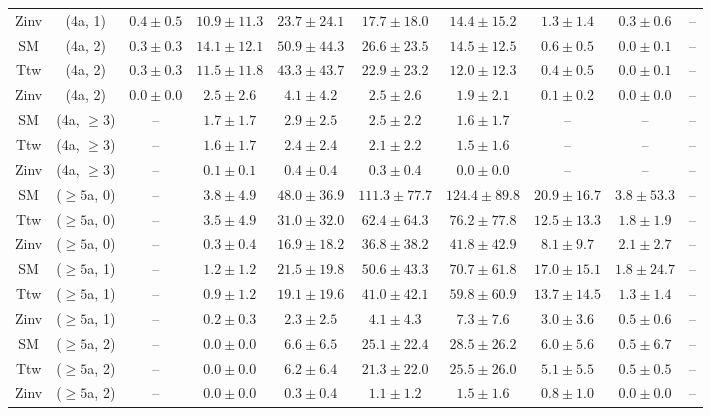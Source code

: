 \begin{table}[h!]
{\begin{tabular}{cccccccccc}
	Zinv & (4a, 1) & $0.4\pm 0.5$ & $10.9\pm 11.3$ & $23.7\pm 24.1$ & $17.7\pm 18.0$ & $14.4\pm 15.2$ & $1.3\pm 1.4$ & $0.3\pm 0.6$ & -- \\[0.5ex] 
	SM & (4a, 2) & $0.3\pm 0.3$ & $14.1\pm 12.1$ & $50.9\pm 44.3$ & $26.6\pm 23.5$ & $14.5\pm 12.5$ & $0.6\pm 0.5$ & $0.0\pm 0.1$ & -- \\[0.5ex] 
	Ttw & (4a, 2) & $0.3\pm 0.3$ & $11.5\pm 11.8$ & $43.3\pm 43.7$ & $22.9\pm 23.2$ & $12.0\pm 12.3$ & $0.4\pm 0.5$ & $0.0\pm 0.1$ & -- \\[0.5ex] 
	Zinv & (4a, 2) & $0.0\pm 0.0$ & $2.5\pm 2.6$ & $4.1\pm 4.2$ & $2.5\pm 2.6$ & $1.9\pm 2.1$ & $0.1\pm 0.2$ & $0.0\pm 0.0$ & -- \\[0.5ex] 
	SM & (4a, $\ge3$) & -- & $1.7\pm 1.7$ & $2.9\pm 2.5$ & $2.5\pm 2.2$ & $1.6\pm 1.7$ & -- & -- & -- \\[0.5ex] 
	Ttw & (4a, $\ge3$) & -- & $1.6\pm 1.7$ & $2.4\pm 2.4$ & $2.1\pm 2.2$ & $1.5\pm 1.6$ & -- & -- & -- \\[0.5ex] 
	Zinv & (4a, $\ge3$) & -- & $0.1\pm 0.1$ & $0.4\pm 0.4$ & $0.3\pm 0.4$ & $0.0\pm 0.0$ & -- & -- & -- \\[0.5ex] 
	SM & ($\ge5$a, 0) & -- & $3.8\pm 4.9$ & $48.0\pm 36.9$ & $111.3\pm 77.7$ & $124.4\pm 89.8$ & $20.9\pm 16.7$ & $3.8\pm 53.3$ & -- \\[0.5ex] 
	Ttw & ($\ge5$a, 0) & -- & $3.5\pm 4.9$ & $31.0\pm 32.0$ & $62.4\pm 64.3$ & $76.2\pm 77.8$ & $12.5\pm 13.3$ & $1.8\pm 1.9$ & -- \\[0.5ex] 
	Zinv & ($\ge5$a, 0) & -- & $0.3\pm 0.4$ & $16.9\pm 18.2$ & $36.8\pm 38.2$ & $41.8\pm 42.9$ & $8.1\pm 9.7$ & $2.1\pm 2.7$ & -- \\[0.5ex] 
	SM & ($\ge5$a, 1) & -- & $1.2\pm 1.2$ & $21.5\pm 19.8$ & $50.6\pm 43.3$ & $70.7\pm 61.8$ & $17.0\pm 15.1$ & $1.8\pm 24.7$ & -- \\[0.5ex] 
	Ttw & ($\ge5$a, 1) & -- & $0.9\pm 1.2$ & $19.1\pm 19.6$ & $41.0\pm 42.1$ & $59.8\pm 60.9$ & $13.7\pm 14.5$ & $1.3\pm 1.4$ & -- \\[0.5ex] 
	Zinv & ($\ge5$a, 1) & -- & $0.2\pm 0.3$ & $2.3\pm 2.5$ & $4.1\pm 4.3$ & $7.3\pm 7.6$ & $3.0\pm 3.6$ & $0.5\pm 0.6$ & -- \\[0.5ex] 
	SM & ($\ge5$a, 2) & -- & $0.0\pm 0.0$ & $6.6\pm 6.5$ & $25.1\pm 22.4$ & $28.5\pm 26.2$ & $6.0\pm 5.6$ & $0.5\pm 6.7$ & -- \\[0.5ex] 
	Ttw & ($\ge5$a, 2) & -- & $0.0\pm 0.0$ & $6.2\pm 6.4$ & $21.3\pm 22.0$ & $25.5\pm 26.0$ & $5.1\pm 5.5$ & $0.5\pm 0.5$ & -- \\[0.5ex] 
	Zinv & ($\ge5$a, 2) & -- & $0.0\pm 0.0$ & $0.3\pm 0.4$ & $1.1\pm 1.2$ & $1.5\pm 1.6$ & $0.8\pm 1.0$ & $0.0\pm 0.0$ & -- \\[0.5ex] 

\end{tabular}}
\end{table}
